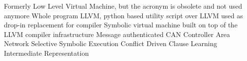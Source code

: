   {Formerly Low Level Virtual Machine, but the acronym
               is obsolete and not used anymore}
 {Whole program LLVM, python based utility script over LLVM
               used as drop-in replacement for compiler}
  {Symbolic virtual machine built on top of the LLVM compiler
               infrastructure}
 {Message authenticated CAN}
 {Controller Area Network}
 {Selective Symbolic Execution}
 {Conflict Driven Clause Learning}
 {Intermediate Representation}
